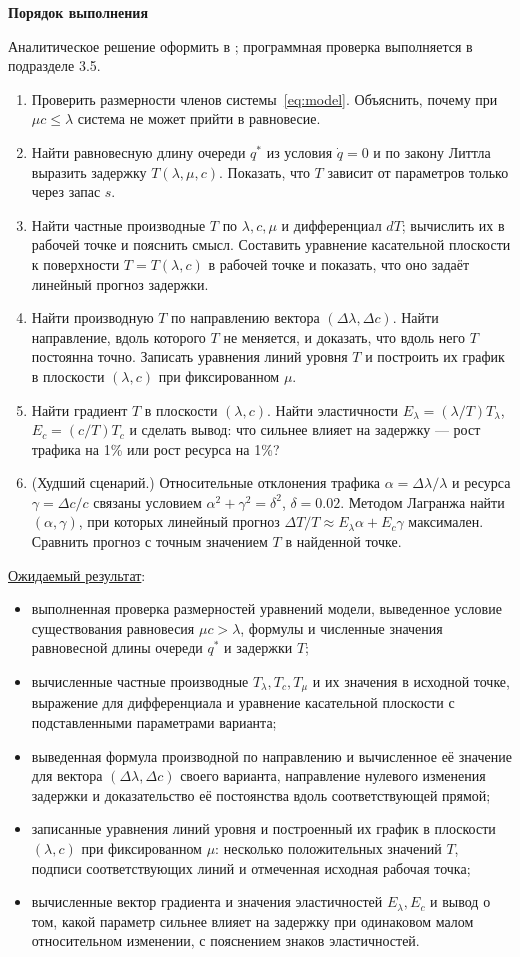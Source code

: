 \documentclass[12pt,a4paper]{article}
\newcommand{\taskhead}[1]{\par\textbf{#1}\par}
\begin{document}
\taskhead{Порядок выполнения}
Аналитическое решение оформить в ; программная проверка выполняется в подразделе 3.5.
\begin{enumerate}
\item Проверить размерности членов системы~\eqref{eq:model}. Объяснить,
почему при $\mu c\leq\lambda$ система не может прийти в равновесие.
\item Найти равновесную длину очереди $q^*$ из условия $\dot q=0$ и по закону
Литтла выразить задержку $T(\lambda,\mu,c)$. Показать, что $T$ зависит
от параметров только через запас $s$.
\item Найти частные производные $T$ по $\lambda,c,\mu$ и дифференциал $dT$;
вычислить их в рабочей точке и пояснить смысл. Составить уравнение касательной
плоскости к поверхности $T=T(\lambda,c)$ в рабочей точке и показать,
что оно задаёт линейный прогноз задержки.
\item Найти производную $T$ по направлению вектора $(\Delta\lambda,\Delta c)$.
Найти направление, вдоль которого $T$ не меняется, и доказать, что вдоль него
$T$ постоянна точно. Записать уравнения линий уровня $T$ и построить их график
в плоскости $(\lambda,c)$ при фиксированном $\mu$.
\item Найти градиент $T$ в плоскости $(\lambda,c)$. Найти эластичности
$E_\lambda=(\lambda/T)T_\lambda$, $E_c=(c/T)T_c$ и сделать вывод:
что сильнее влияет на задержку --- рост трафика на 1\% или рост ресурса на 1\%?
\item[6*.] (Худший сценарий.) Относительные отклонения трафика
$\alpha=\Delta\lambda/\lambda$ и ресурса $\gamma=\Delta c/c$ связаны
условием $\alpha^2+\gamma^2=\delta^2$, $\delta=0.02$.
Методом Лагранжа найти $(\alpha,\gamma)$, при которых линейный прогноз
$\Delta T/T\approx E_\lambda\alpha+E_c\gamma$ максимален.
Сравнить прогноз с точным значением $T$ в найденной точке.
\end{enumerate}
\underline{Ожидаемый результат}:
\begin{itemize}
\item выполненная проверка размерностей уравнений модели, выведенное условие существования
равновесия $\mu c>\lambda$, формулы и численные значения равновесной
длины очереди $q^*$ и задержки $T$;
\item вычисленные частные производные $T_\lambda,T_c,T_\mu$ и их значения
в исходной точке, выражение для дифференциала и уравнение касательной
плоскости с подставленными параметрами варианта;
\item выведенная формула производной по направлению и вычисленное её значение для вектора
$(\Delta\lambda,\Delta c)$ своего варианта, направление нулевого изменения
задержки и доказательство её постоянства вдоль соответствующей прямой;
\item записанные уравнения линий уровня и построенный их график в плоскости $(\lambda,c)$
при фиксированном $\mu$: несколько положительных значений $T$,
подписи соответствующих линий и отмеченная исходная рабочая точка;
\item вычисленные вектор градиента и значения эластичностей $E_\lambda,E_c$ и вывод
о том, какой параметр сильнее влияет на задержку при одинаковом малом
относительном изменении, с пояснением знаков эластичностей.
\end{itemize}
\end{document}
